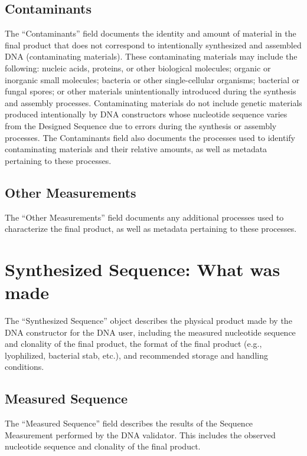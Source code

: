 \documentclass[12pt,letterpaper,english]{article}
\begin{document}
\subsection{Contaminants}
The “Contaminants” field documents the identity and amount of material in the final product that does not correspond to intentionally synthesized and assembled DNA (contaminating materials). These contaminating materials may include the following: nucleic acids, proteins, or other biological molecules; organic or inorganic small molecules; bacteria or other single-cellular organisms; bacterial or fungal spores; or other materials unintentionally introduced during the synthesis and assembly processes. Contaminating materials do not include genetic materials produced intentionally by DNA constructors whose nucleotide sequence varies from the Designed Sequence due to errors during the synthesis or assembly processes. The Contaminants field also documents the processes used to identify contaminating materials and their relative amounts, as well as metadata pertaining to these processes. \par

\subsection{Other Measurements}
The “Other Measurements” field documents any additional processes used to characterize the final product, as well as metadata pertaining to these processes. \par

\section{Synthesized Sequence: What was made}
The “Synthesized Sequence” object describes the physical product made by the DNA constructor for the DNA user, including the measured nucleotide sequence and clonality of the final product, the format of the final product (e.g., lyophilized, bacterial stab, etc.), and recommended storage and handling conditions. \par

\subsection{Measured Sequence}
The “Measured Sequence” field describes the results of the Sequence Measurement performed by the DNA validator. This includes the observed nucleotide sequence and clonality of the final product. \par
\end{document}
